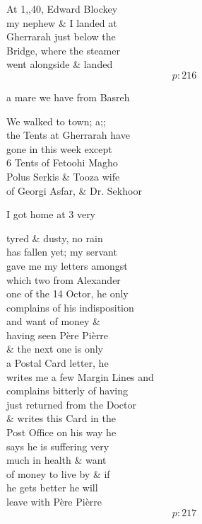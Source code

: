 \documentclass{report}
\begin{document}
	\par{
 	At 1,,40, Edward Blockey\ \\my nephew \& I landed at\ \\Gherrarah just below the\ \\Bridge, where the steamer\ \\went alongside \& landed\ \\
  \[p: 216 \]

	}


	\par{
 	a mare we have from Basreh\ \\
	}

	\par{
 	We walked to town; a;;\ \\the Tents at Gherrarah have\ \\gone in this week except\ \\6 Tents of Fetoohi Magho\ \\Polus Serkis \& Tooza wife\ \\of Georgi Asfar, \& Dr. Sekhoor\ \\
	}

	\par{
 	I got home at 3 very\ \\
	}

	\par{
 	tyred \& dusty, no rain\ \\has fallen yet; my servant\ \\gave me my letters amongst\ \\which two from Alexander\ \\one of the 14 Octor, he only\ \\complains of his indisposition\ \\and want of money \&\ \\having seen Père Pièrre\ \\\& the next one is only\ \\a Postal Card letter, he\ \\writes me a few Margin Lines and\ \\complains bitterly of having\ \\just returned from the Doctor\ \\\& writes this Card in the\ \\Post Office on his way he\ \\says he is suffering very\ \\much in health \& want\ \\of money to live by \& if\ \\he gets better he will\ \\leave with Père Pièrre\ \\
  \[p: 217 \]

	}
\end{document}
